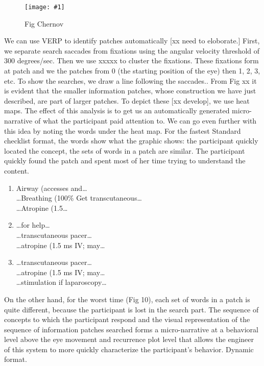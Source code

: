 \documentclass{sigchi}
\newcommand{\insertpicture}[2]{\begin{center}\texttt{[image: \#1]}\end{center}}
\begin{document}
\begin{figure}
	\insertpicture{figures/dummy.eps}{0.5}
	\caption{Fig Chernov\label{fig:chernov}} 
\end{figure} 

We can use VERP to identify patches automatically
[xx need to eloborate.] First, we separate search saccades from fixations
using the angular velocity threshold of 300 degrees/sec. Then we use xxxxx
to cluster the fixations. These fixations form at patch and we the patches
from 0 (the starting position of the eye) then 1, 2, 3, etc. To show the
searches, we draw a line following the saccades.. From Fig xx it is evident
that the smaller information patches, whose construction we have just
described, are part of larger patches. To depict these [xx develop], we use
heat maps. The effect of this analysis is to get us an automatically
generated micro-narrative of what the participant paid attention to. We can
go even further with this idea by noting the words under the heat map. For
the fastest Standard checklist format, the words show what the graphic
shows: the participant quickly located the concept, the sets of words in a
patch are similar. The participant quickly found the patch and spent most
of her time trying to understand the content. 

\begin{enumerate}
	\item Airway (accesses and\ldots  \\
		\ldots Breathing (100\% Get transcutaneous\ldots  \\
		\ldots Atropine (1.5\ldots  
	\item	\ldots for help\ldots  \\
	\ldots transcutaneous pacer\ldots  \\
	\ldots atropine (1.5 ms IV; may\ldots  \\
	\item  \ldots transcutaneous pacer\ldots  \\
		\ldots atropine (1.5 ms IV; may\ldots  \\
    \ldots stimulation if laparoscopy\ldots 
\end{enumerate}

On the other hand, for the worst time (Fig 10), each set of words in a
patch is quite different, because the participant is lost in the search
part. The sequence of concepts to which the participant respond and the
visual representation of the sequence of information patches searched forms
a micro-narrative at a behavioral level above the eye movement and
recurrence plot level that allows the engineer of this system to more
quickly characterize the participant’s behavior. Dynamic format. 
\end{document}
